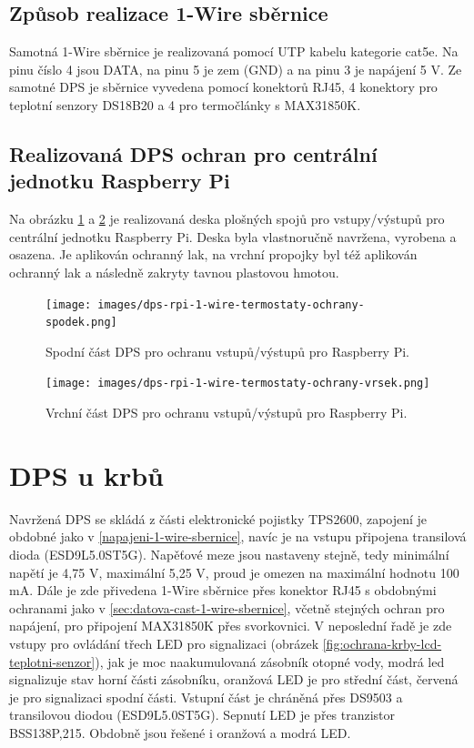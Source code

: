 \subsection{Způsob realizace 1-Wire sběrnice}
Samotná 1-Wire sběrnice je realizovaná pomocí UTP kabelu kategorie cat5e. Na pinu číslo 4 jsou DATA, na pinu 5 je zem (GND) a na pinu 3 je napájení 5 V. Ze samotné DPS je sběrnice vyvedena pomocí konektorů RJ45, 4 konektory pro teplotní senzory DS18B20 a 4 pro termočlánky s MAX31850K.

\subsection{Realizovaná DPS ochran pro centrální jednotku Raspberry Pi}
Na obrázku \ref{fig:dps-rpi-1-wire-termostaty-ochrany-spodek} a \ref{fig:dps-rpi-1-wire-termostaty-ochrany-vrsek} je realizovaná deska plošných spojů pro vstupy/výstupů pro centrální jednotku Raspberry Pi. Deska byla vlastnoručně navržena, vyrobena a osazena. Je aplikován ochranný lak, na vrchní propojky byl též aplikován ochranný lak a následně zakryty tavnou plastovou hmotou.

\begin{figure}[H]
    \centering
    \texttt{[image: images/dps-rpi-1-wire-termostaty-ochrany-spodek.png]}
    \caption[Spodní část DPS pro ochranu vstupů/výstupů pro Raspberry Pi.]{Spodní část DPS pro ochranu vstupů/výstupů pro Raspberry Pi.}
    \label{fig:dps-rpi-1-wire-termostaty-ochrany-spodek}
\end{figure}

\begin{figure}[H]
    \centering
    \texttt{[image: images/dps-rpi-1-wire-termostaty-ochrany-vrsek.png]}
    \caption[Vrchní část DPS pro ochranu vstupů/výstupů pro Raspberry Pi.]{Vrchní část DPS pro ochranu vstupů/výstupů pro Raspberry Pi.}
    \label{fig:dps-rpi-1-wire-termostaty-ochrany-vrsek}
\end{figure}

\section{DPS u krbů}
Navržená DPS se skládá z části elektronické pojistky TPS2600, zapojení je obdobné jako v \ref{napajeni-1-wire-sbernice}, navíc je na vstupu připojena transilová dioda (ESD9L5.0ST5G). Napěťové meze jsou nastaveny stejně, tedy minimální napětí je 4,75 V, maximální 5,25 V, proud je omezen na maximální hodnotu 100 mA. Dále je zde přivedena 1-Wire sběrnice přes konektor RJ45 s obdobnými ochranami jako v \ref{sec:datova-cast-1-wire-sbernice}, včetně stejných ochran pro napájení, pro připojení MAX31850K přes svorkovnici. V neposlední řadě je zde vstupy pro ovládání třech LED pro signalizaci (obrázek \ref{fig:ochrana-krby-lcd-teplotni-senzor}), jak je moc naakumulovaná zásobník otopné vody, modrá led signalizuje stav horní části zásobníku, oranžová LED je pro střední část, červená je pro signalizaci spodní části. Vstupní část je chráněná přes DS9503 a transilovou diodou (ESD9L5.0ST5G). Sepnutí LED je přes tranzistor BSS138P,215. Obdobně jsou řešené i oranžová a modrá LED.

